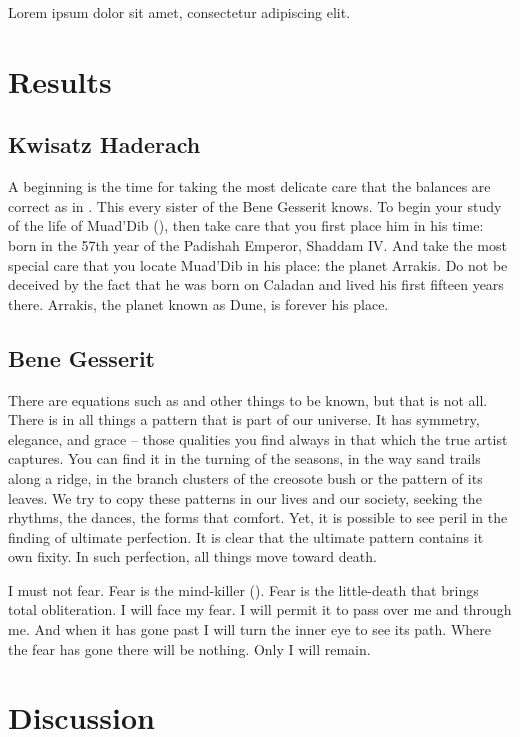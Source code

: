 
Lorem ipsum dolor sit amet, consectetur adipiscing elit\cite{OKeeNade78a}. \lipsum[2-3]

\section*{Results}

\subsection*{Kwisatz Haderach}

A beginning is the time for taking the most delicate care that the balances are correct as in . This every
sister of the Bene Gesserit knows.  To begin your study of the life
of Muad'Dib (), then take care that you first place him in his time: born in the 57th year of the
Padishah Emperor, Shaddam IV. And take the most special care that you locate Muad'Dib in his place: the planet Arrakis.
Do not be deceived by the fact that he was born on Caladan and lived his first fifteen years there. Arrakis, the planet
known as Dune, is forever his place.

\subsection*{Bene Gesserit}

There are equations such as  and other things to be known\cite{Hill78a}, but that is not all. There is in
all things a pattern that is part of our universe. It has symmetry, elegance, and grace -- those qualities you find
always in that which the true artist captures. You can find it in the turning of the seasons, in the way sand trails
along a ridge, in the branch clusters of the creosote bush or the pattern of its leaves. We try to copy these patterns
in our lives and our society, seeking the rhythms, the dances, the forms that comfort. Yet, it is possible to see peril
in the finding of ultimate perfection. It is clear that the ultimate pattern contains it own fixity. In such
perfection, all things move toward death.

I must not fear. Fear is the mind-killer (). Fear is the little-death that brings total
obliteration. I will face my fear. I will permit it to pass over me and through me. And when it has gone past I will
turn the inner eye to see its path. Where the fear has gone there will be nothing. Only I will remain. 

\section*{Discussion}

\lipsum[4-6]

